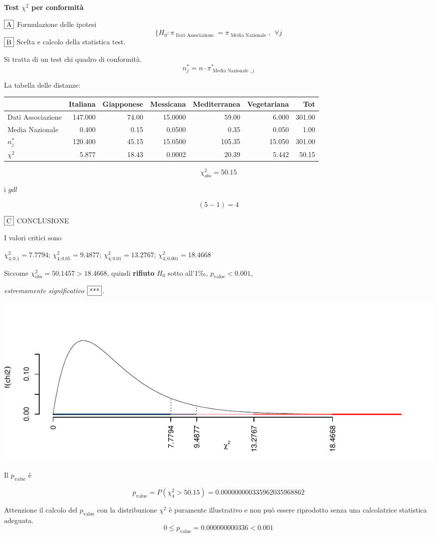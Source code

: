 \documentclass[
  11pt,
]{book}
\theoremstyle{mytheoremstyle}
\theoremstyle{mydefstyle}
\newenvironment{sol}
  {
  \begin{tcolorbox}[enhanced,breakable,arc=0.1mm,boxrule=1pt,colback=white,colframe=iblue,
  title=\bf \fontfamily{lmss}\selectfont \hspace{.5 cm} Soluzione,drop fuzzy shadow]

}{
\end{tcolorbox}
  }
\begin{document}
\begin{sol}
\textbf{Test \(\chi^2\) per conformità}

\(\fbox{A}\) Formulazione delle ipotesi
\[
\{H_0:\pi_\text{ Dati Associazione }= \pi_\text{ Media Nazionale },~~\forall j
\]
\(\fbox{B}\) Scelta e calcolo della statistica test.

Si tratta di un test chi quadro di conformità.
\[
n^*_j = n\cdot \pi^*_{\text{ Media Nazionale },j} 
\]

La tabella delle distanze:

\begin{table}[H]
\centering
\begin{tabular}{lrrrrrr}
\toprule
  & Italiana & Giapponese & Messicana & Mediterranea & Vegetariana & Tot\\
\midrule
Dati Associazione & 147.000 & 74.00 & 15.0000 & 59.00 & 6.000 & 301.00\\
Media Nazionale & 0.400 & 0.15 & 0.0500 & 0.35 & 0.050 & 1.00\\
$n_j^*$ & 120.400 & 45.15 & 15.0500 & 105.35 & 15.050 & 301.00\\
$\chi^2$ & 5.877 & 18.43 & 0.0002 & 20.39 & 5.442 & 50.15\\
\bottomrule
\end{tabular}
\end{table}

\[
    \chi^2_{obs}= 50.15 
  \]

i \(gdl\)

\[
    ( 5 -1)= 4 
  \]

\(\fbox{C}\) CONCLUSIONE

I valori critici sono

\(\chi^2_{4;0.1}=7.7794\); \(\chi^2_{4;0.05}=9.4877\); \(\chi^2_{4;0.01}=13.2767\); \(\chi^2_{4;0.001}=18.4668\)

Siccome \(\chi^2_\text{obs}=50.1457>18.4668\), quindi \textbf{rifiuto} \(H_0\) sotto all'1‰, \(p_\text{value}<0.001\),

\emph{estremamente significativo} \(\fbox{***}\).

\begin{center}\includegraphics{Esami_passati_con_soluzioni_files/figure-latex/05a-chi2-12-1} \end{center}

Il \(p_{\text{value}}\) è

\[ p_{\text{value}} = P(\chi^2_{4}>50.15)=0.000000000335962035968862 \]

Attenzione il calcolo del \(p_\text{value}\) con la distribuzione \(\chi^2\) è puramente illustrativo e non può essere riprodotto senza una calcolatrice statistica adeguata.\[
 0 \leq p_\text{value}= 0.000000000336 < 0.001 
\]

\end{sol}
\end{document}
